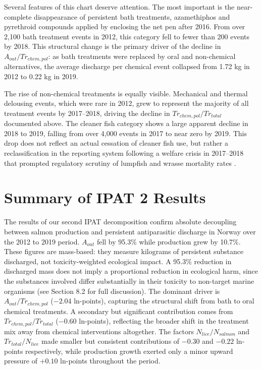 \documentclass[12pt, a4paper]{report}
\begin{document}
Several features of this chart deserve attention. The most important
is the near-complete disappearance of persistent bath treatments,
azamethiphos and pyrethroid compounds applied by enclosing the net
pen after 2016. From over 2,100 bath treatment events in 2012,
this category fell to fewer than 200 events by 2018. This structural
change is the primary driver of the decline in
$A_{out}/Tr_{chem,pol}$: as bath treatments were replaced by
oral and non-chemical alternatives, the average discharge per
chemical event collapsed from 1.72 kg in 2012 to 0.22 kg in 2019.

The rise of non-chemical treatments is equally visible. Mechanical
and thermal delousing events, which were rare in 2012, grew to
represent the majority of all treatment events by 2017--2018,
driving the decline in $Tr_{chem,pol}/Tr_{total}$ documented above.
The cleaner fish category shows a large apparent decline in
2018 to 2019, falling from over 4,000 events in 2017 to near zero
by 2019. This drop does not reflect an actual cessation of cleaner
fish use, but rather a reclassification in the reporting system
following a welfare crisis in 2017--2018 that prompted regulatory
scrutiny of lumpfish and wrasse mortality rates
\citep{myhrjensen2020}.

\section{Summary of IPAT 2 Results}

The results of our second IPAT decomposition confirm absolute decoupling between salmon production and persistent antiparasitic discharge in Norway over the 2012 to 2019 period. $A_{out}$ fell by 95.3\% while production grew by 10.7\%. These figures are mass-based: they measure kilograms of persistent substance discharged, not toxicity-weighted ecological impact. A 95.3\% reduction in discharged mass does not imply a proportional reduction in ecological harm, since the substances involved differ substantially in their toxicity to non-target marine organisms (see Section 8.2 for full discussion). The dominant driver is $A_{out}/Tr_{chem,pol}$ ($-2.04$ ln-points), capturing the structural shift from bath to oral chemical treatments. A secondary but significant contribution comes from $Tr_{chem,pol}/Tr_{total}$ ($-0.60$ ln-points), reflecting the broader shift in the treatment mix away from chemical interventions altogether. The factors
$N_{lice}/N_{salmon}$ and $Tr_{total}/N_{lice}$ made smaller but consistent contributions of $-0.30$ and $-0.22$ ln-points respectively, while production growth exerted only a minor upward pressure of $+0.10$ ln-points throughout the period.
\end{document}
